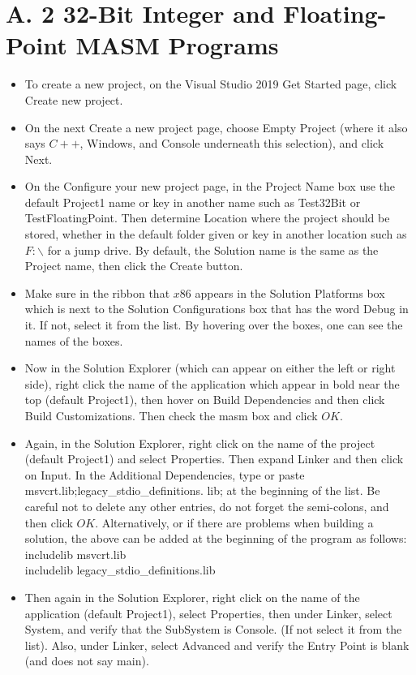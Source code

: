 \documentclass[10pt]{article}
\begin{document}
\section*{A. 2 32-Bit Integer and Floating-Point MASM Programs}
\begin{itemize}
  \item To create a new project, on the Visual Studio 2019 Get Started page, click Create new project.
  \item On the next Create a new project page, choose Empty Project (where it also says $C++$, Windows, and Console underneath this selection), and click Next.
  \item On the Configure your new project page, in the Project Name box use the default Project1 name or key in another name such as Test32Bit or TestFloatingPoint. Then determine Location where the project should be stored, whether in the default folder given or key in another location such as $F: \backslash$ for a jump drive. By default, the Solution name is the same as the Project name, then click the Create button.
  \item Make sure in the ribbon that $x 86$ appears in the Solution Platforms box which is next to the Solution Configurations box that has the word Debug in it. If not, select it from the list. By hovering over the boxes, one can see the names of the boxes.
  \item Now in the Solution Explorer (which can appear on either the left or right side), right click the name of the application which appear in bold near the top (default Project1), then hover on Build Dependencies and then click Build Customizations. Then check the masm box and click $O K$.
  \item Again, in the Solution Explorer, right click on the name of the project (default Project1) and select Properties. Then expand Linker and then click on Input. In the Additional Dependencies, type or paste msvcrt.lib;legacy\_stdio\_definitions. lib; at the beginning of the list. Be careful not to delete any other entries, do not forget the semi-colons, and then click $O K$. Alternatively, or if there are problems when building a solution, the above can be added at the beginning of the program as follows:\\
includelib msvcrt.lib\\
includelib legacy\_stdio\_definitions.lib
  \item Then again in the Solution Explorer, right click on the name of the application (default Project1), select Properties, then under Linker, select System, and verify that the SubSystem is Console. (If not select it from the list). Also, under Linker, select Advanced and verify the Entry Point is blank (and does not say main).

\end{itemize}
\end{document}
